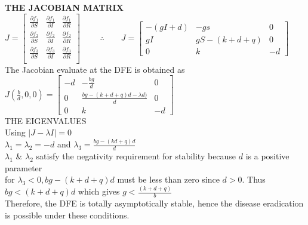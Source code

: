 \documentclass[12pt]{report}
\newcommand{\bt}[1]{\textbf{#1}}
\newcommand{\spn}[1]{\\[#1cm]}
\newcommand{\NI}{\noindent}
\newcommand{\dsp}{\displaystyle}
\begin{document}
	\NI\bt{THE JACOBIAN MATRIX}\spn{0.7}
	$J = \begin{bmatrix}
		\frac{\partial f_1}{\partial S} & \frac{\partial f_1}{\partial I} & \frac{\partial f_1}{\partial R}\\
		\frac{\partial f_2}{\partial S} & \frac{\partial f_2}{\partial I} & \frac{\partial f_2}{\partial R}\\
		\frac{\partial f_3}{\partial S} & \frac{\partial f_3}{\partial I} & \frac{\partial f_3}{\partial R}\\
	\end{bmatrix}$
	$\qquad\therefore
	\qquad J = \begin{bmatrix}
		-(gI+d) & -gs & 0\\
		gI & gS-(k+d+q) & 0 \\
		0 & k & -d
	\end{bmatrix}
	$
	\spn{0.7}
	The Jacobian evaluate at the DFE is obtained as\spn{0.5}
	$\dsp J\left(\frac{b}{d},0,0\right) = 
		\begin{bmatrix}
			-d & -\frac{bg}{d} & 0\\
			0 & \frac{bg - (k+d+q)d - \lambda d)}{d} & 0\\
			0 & k & -d
		\end{bmatrix}
	$\spn{0.8}
	THE EIGENVALUES\\
	Using $|J - \lambda I| = 0$\\
	$\lambda_1 =\lambda_2 = -d$ and $\dsp\lambda_3 = \frac{bg-(kd+q)d}{d}$\\
	$\lambda_1$ \& $\lambda_2$ satisfy the negativity requirement for stability because $d$ is a positive parameter\spn{0.3}
	for $\lambda_3 < 0, bg-(k+d+q)d$ must be less than zero since $d>0$. Thus $bg < (k+d+q)d$ which gives $\dsp g < \frac{(k+d+q)}{b}$\spn{0.5}
	
	\NI Therefore, the DFE is totally asymptotically stable, hence the disease eradication is possible under these conditions.
	
\end{document}
